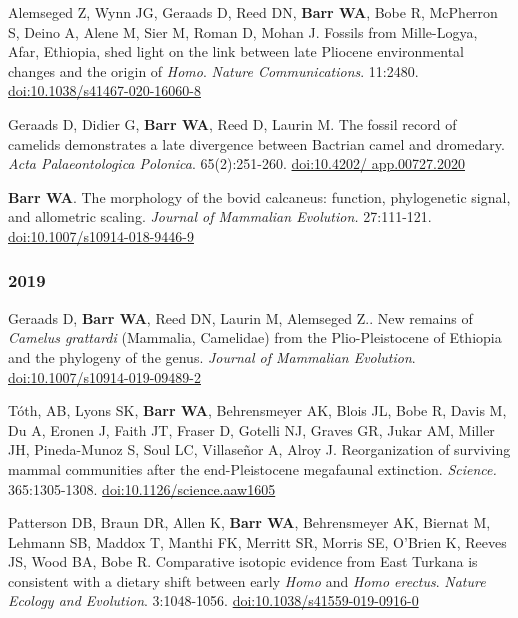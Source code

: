 \begin{etaremune}
\item Alemseged Z, Wynn JG, Geraads D, Reed DN, {\bfseries Barr WA}, Bobe R, McPherron S, Deino A, Alene M, Sier M, Roman D,  Mohan J. Fossils from Mille-Logya, Afar, Ethiopia, shed light on the link between late Pliocene environmental changes and the origin of \emph{Homo}. \emph{Nature Communications}. 11:2480. \href{https://doi.org/10.1038/s41467-020-16060-8 }{doi:10.1038/s41467-020-16060-8}

\item Geraads D, Didier G, {\bfseries Barr WA}, Reed D, Laurin M. The fossil record of camelids demonstrates a late divergence between Bactrian camel and dromedary. \emph{Acta Palaeontologica Polonica}. 65(2):251-260. \href{https://doi.org/10.4202/app.00727.2020}{doi:10.4202/ app.00727.2020}

\item {\bfseries Barr WA}. The morphology of the bovid calcaneus: function, phylogenetic signal, and allometric scaling. \emph{Journal of Mammalian Evolution.}  27:111-121. \href{https://dx.doi.org/10.1007/s10914-018-9446-9}{doi:10.1007/s10914-018-9446-9}

\subsubsection*{2019}

\item Geraads D, {\bfseries Barr WA}, Reed DN, Laurin M, Alemseged Z.. New remains of \emph{Camelus grattardi} (Mammalia, Camelidae) from the Plio-Pleistocene of Ethiopia and the phylogeny of the genus. \emph{Journal of Mammalian Evolution}. \href{https://doi.org/10.1007/s10914-019-09489-2}{doi:10.1007/s10914-019-09489-2}

\item Tóth, AB, Lyons SK, {\bfseries Barr WA}, Behrensmeyer AK, Blois JL, Bobe R, Davis M, Du A, Eronen J, Faith JT, Fraser D, Gotelli NJ, Graves GR, Jukar AM, Miller JH, Pineda-Munoz S, Soul LC, Villaseñor A, Alroy J. Reorganization of surviving mammal communities after the end-Pleistocene megafaunal extinction. \emph{Science.} 365:1305-1308. \href{https://dx.doi.org/10.1126/science.aaw1605 }{doi:10.1126/science.aaw1605}

\item Patterson DB, Braun DR, Allen K, {\bfseries Barr WA}, Behrensmeyer AK, Biernat M, Lehmann SB, Maddox T, Manthi FK, Merritt SR, Morris SE, O'Brien K, Reeves JS, Wood BA, Bobe R. Comparative isotopic evidence from East Turkana is consistent with a dietary shift between early \emph{Homo} and \emph{Homo erectus}. \emph{Nature Ecology and Evolution}. 3:1048-1056. \href{https://dx.doi.org/10.1038/s41559-019-0916-0}{doi:10.1038/s41559-019-0916-0}


\end{etaremune}
